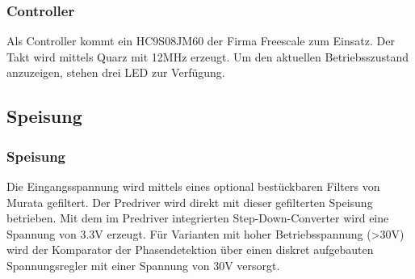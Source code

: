\subsubsection{Controller}
\fi
Als Controller kommt ein HC9S08JM60 der Firma Freescale zum Einsatz. Der Takt 
wird mittels Quarz mit 12MHz erzeugt. Um den aktuellen Betriebsszustand 
anzuzeigen, stehen drei LED zur Verfügung. 

\ifSTANDALONE
\subsection{Speisung}
\fi
\ifEMBED
\subsubsection{Speisung}
\fi
Die Eingangsspannung wird mittels eines optional bestückbaren Filters von 
Murata gefiltert. Der Predriver wird direkt mit dieser gefilterten Speisung 
betrieben. Mit dem im Predriver integrierten Step-Down-Converter wird eine 
Spannung von 3.3V erzeugt. Für Varianten mit hoher Betriebsspannung (>30V) 
wird der Komparator der Phasendetektion über einen diskret aufgebauten 
Spannungsregler mit einer Spannung von 30V versorgt. 

